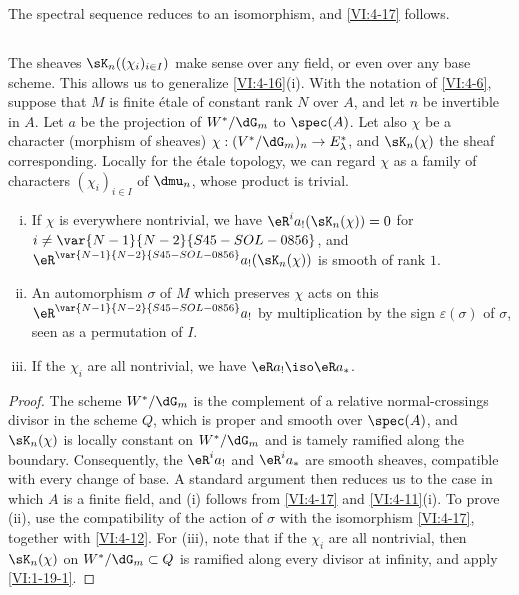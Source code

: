 The spectral sequence reduces to an isomorphism, and \ref{VI:4-17} follows. 





\subsection{}\label{VI:4-19}

The sheaves $\sK_n((\chi_i)_{i\in I})$ make sense over any field, 
or even over any base scheme. This allows us to generalize 
\ref{VI:4-16}(i). With the notation of \ref{VI:4-6}, suppose that $M$ is finite 
étale of constant rank $N$ over $A$, and let $n$ be invertible in $A$. 
Let $a$ be the projection of $W^\ast/\dG_m$ to $\spec(A)$. Let also $\chi$ be 
a character (morphism of sheaves) 
$\chi:(V^\ast/\dG_m)_n \to E_\lambda^\ast$, and $\sK_n(\chi)$ the sheaf 
corresponding. Locally for the étale topology, we can regard $\chi$ 
as a family of characters $(\chi_i)_{i\in I}$ of $\dmu_n$, whose product is 
trivial.

\begin{proposition_}\label{VI:4-20}
\begin{enumerate}[(i)]
  \item If $\chi$ is everywhere nontrivial, we have 
    $\eR^i a_! (\sK_n(\chi)) = 0$ for $i\ne \var{N-1}{N-2}{S45-SOL-0856}$, and 
    $\eR^{\var{N-1}{N-2}{S45-SOL-0856}} a_!(\sK_n(\chi))$ is smooth of rank $1$. 
  \item An automorphism $\sigma$ of $M$ which preserves $\chi$ acts on this 
    $\eR^{\var{N-1}{N-2}{S45-SOL-0856}} a_!$ by multiplication by the sign $\varepsilon(\sigma)$ 
    of $\sigma$, seen as a permutation of $I$. 
  \item If the $\chi_i$ are all nontrivial, we have $\eR a_! \iso \eR a_\ast$. 
\end{enumerate}
\end{proposition_}
\begin{proof}[Proof]
The scheme $W^\ast/\dG_m$ is the complement of a relative normal-crossings 
divisor in the scheme $Q$, which is proper and smooth over $\spec(A)$, and 
$\sK_n(\chi)$ is 
locally constant on $W^\ast/\dG_m$ and is tamely ramified 
along the boundary. Consequently, the $\eR^i a_!$ and 
$\eR^i a_\ast$ are smooth sheaves, compatible with every change of 
base. A standard argument then reduces us to the case in which $A$ is a 
finite field, and (i) follows from \ref{VI:4-17} and \ref{VI:4-11}(i). 
To prove (ii), use the compatibility of the action of $\sigma$ with 
the isomorphism \ref{VI:4-17}, together with \ref{VI:4-12}. For (iii), note that if the 
$\chi_i$ are all nontrivial, then $\sK_n(\chi)$ on 
$W^\ast/\dG_m\subset Q$ is ramified along every divisor at infinity, 
and apply \ref{VI:1-19-1}. 
\end{proof}











